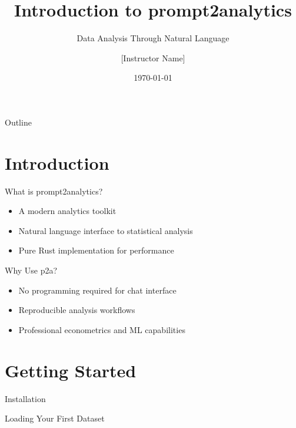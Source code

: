 \documentclass[aspectratio=169]{beamer}
\title{Introduction to prompt2analytics}
\subtitle{Data Analysis Through Natural Language}
\author{[Instructor Name]}
\institute{[Institution]}
\date{\today}
\begin{document}
\maketitle

\begin{frame}{Outline}
    \tableofcontents
\end{frame}

\section{Introduction}

\begin{frame}{What is prompt2analytics?}
    \begin{itemize}
        \item A modern analytics toolkit
        \item Natural language interface to statistical analysis
        \item Pure Rust implementation for performance
    \end{itemize}
\end{frame}

\begin{frame}{Why Use p2a?}
    \begin{itemize}
        \item No programming required for chat interface
        \item Reproducible analysis workflows
        \item Professional econometrics and ML capabilities
    \end{itemize}
\end{frame}

\section{Getting Started}

\begin{frame}{Installation}
\end{frame}

\begin{frame}{Loading Your First Dataset}
\end{frame}
\end{document}
